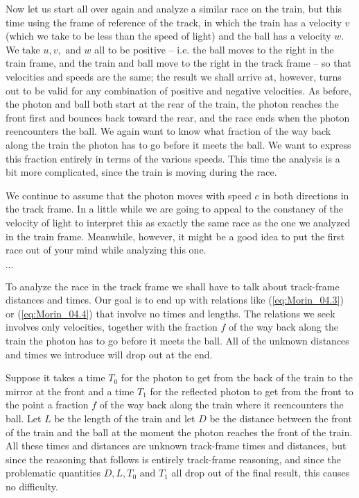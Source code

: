 Now let us start all over again and analyze a similar race on the train, but this time using the frame of reference of the track, in which the train has a velocity $v$ (which we take to be less than the speed of light) and the ball has a velocity $w$. We take $u, v, \text{ and } w$ all to be positive -- i.e. the ball moves to the right in the train frame, and the train and ball move to the right in the track frame -- so that velocities and speeds are the same; the result we shall arrive at, however, turns out to be valid for any combination of positive and negative velocities. As before, the photon and ball both start at the rear of the train, the photon reaches the front first and bounces back toward the rear, and the race ends when the photon reencounters the ball. We again want to know what fraction of the way back along the train the photon has to go before it meets the ball. We want to express this fraction entirely in terms of the various speeds. This time the analysis is a bit more complicated, since the train is moving during the race.

We continue to assume that the photon moves with speed $c$ in both directions in the track frame. In a little while we are going to appeal to the constancy of the velocity of light to interpret this as exactly the same race as the one we analyzed in the train frame. Meanwhile, however, it might be a good idea to put the first race out of your mind while analyzing this one.  

$\cdots$

To analyze the race in the track frame we shall have to talk about track-frame distances and times. Our goal is to end up with relations like (\ref{eq:Morin_04.3}) or (\ref{eq:Morin_04.4}) that involve no times and lengths. The relations we seek involves only velocities, together with the fraction $f$ of the way back along the train the photon has to go before it meets the ball. All of the unknown distances and times we introduce will drop out at the end. 

Suppose it takes a time $T_0$ for the photon to get from the back of the train to the mirror at the front and a time $T_1$ for the reflected photon to get from the front to the point a fraction $f$ of the way back along the train where it reencounters the ball. Let $L$ be the length of the train and let $D$ be the distance between the front of the train and the ball at the moment the photon reaches the front of the train. All these times and distances are unknown track-frame times and distances, but since the reasoning that follows is entirely track-frame reasoning, and since the problematic quantities 
$D, L, T_0 \text{ and } T_1$ all drop out of the final result, this causes no difficulty. 

